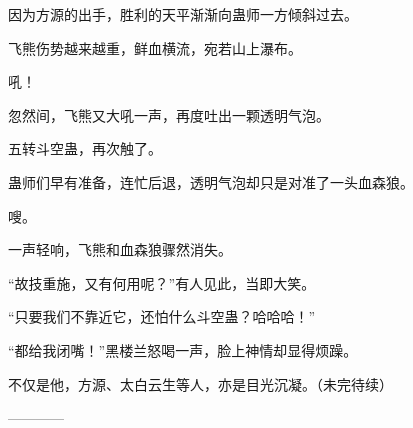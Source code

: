 \begin{this_body}
因为方源的出手，胜利的天平渐渐向蛊师一方倾斜过去。

飞熊伤势越来越重，鲜血横流，宛若山上瀑布。

吼！

忽然间，飞熊又大吼一声，再度吐出一颗透明气泡。

五转斗空蛊，再次触了。

蛊师们早有准备，连忙后退，透明气泡却只是对准了一头血森狼。

嗖。

一声轻响，飞熊和血森狼骤然消失。

“故技重施，又有何用呢？”有人见此，当即大笑。

“只要我们不靠近它，还怕什么斗空蛊？哈哈哈！”

“都给我闭嘴！”黑楼兰怒喝一声，脸上神情却显得烦躁。

不仅是他，方源、太白云生等人，亦是目光沉凝。（未完待续）

------------

\end{this_body}

